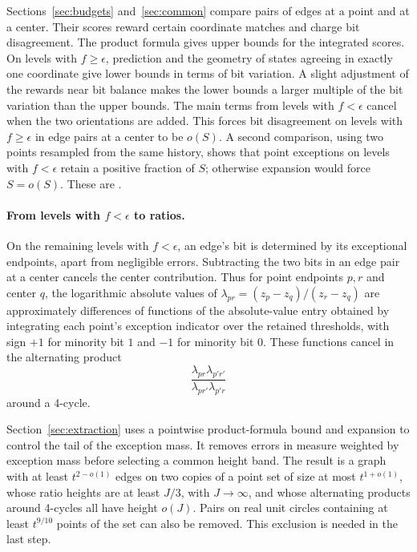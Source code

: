 Sections~\ref{sec:budgets} and~\ref{sec:common} compare pairs of edges
at a point and at a center. Their scores reward certain coordinate
matches and charge bit disagreement. The product formula gives upper
bounds for the integrated scores. On levels with $f\ge\epsilon$, prediction and
the geometry of states agreeing in exactly one coordinate give lower
bounds in terms of bit variation. A slight adjustment of the rewards
near bit balance makes the lower bounds a larger multiple of the bit
variation than the upper bounds. The main terms from levels with $f<\epsilon$ cancel when
the two orientations are added. This forces bit disagreement on levels with $f\ge\epsilon$ in
edge pairs at a center to be \(o(S)\). A second comparison, using two points
resampled from the same history, shows that point exceptions on levels with $f<\epsilon$
retain a positive fraction of \(S\); otherwise expansion would force
\(S=o(S)\). These are .

\paragraph{\texorpdfstring{From levels with $f<\epsilon$ to ratios.}{From levels with f<epsilon to ratios.}}
On the remaining levels with $f<\epsilon$, an edge's bit is determined by its
exceptional endpoints, apart from negligible errors. Subtracting the
two bits in an edge pair at a center cancels the center contribution. Thus for point
endpoints \(p,r\) and center \(q\), the logarithmic absolute values of
\(\lambda_{pr}=(z_p-z_q)/(z_r-z_q)\) are approximately differences
of functions of the absolute-value entry obtained by integrating each point's exception indicator over the retained thresholds, with sign $+1$ for minority bit $1$ and $-1$ for minority bit $0$. These functions cancel in
the alternating product
\[
 \frac{\lambda_{pr}\lambda_{p'r'}}{\lambda_{pr'}\lambda_{p'r}}
\]
around a 4-cycle.

Section~\ref{sec:extraction} uses a pointwise product-formula bound
and expansion to control the tail of the exception mass. It removes
errors in measure weighted by exception mass before selecting a common height
band. The result is a graph with at least \(t^{2-o(1)}\) edges on
two copies of a point set of size at most \(t^{1+o(1)}\), whose
ratio heights are at least \(J/3\), with \(J\to\infty\), and whose
alternating products around 4-cycles all have height \(o(J)\). Pairs on real unit
circles containing at least \(t^{9/10}\) points of the set can
also be removed. This exclusion is needed in the last step.

